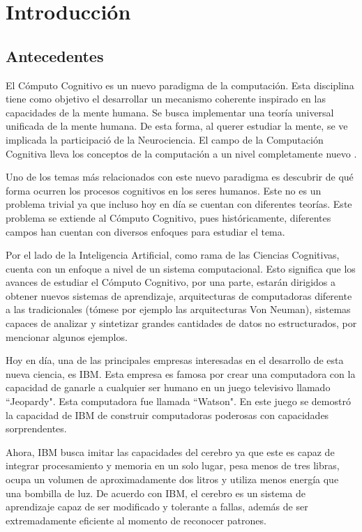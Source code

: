 \chapter{Introducci\'{o}n}
\label{ch:intro}

\section{Antecedentes}
El C\'{o}mputo Cognitivo es un nuevo paradigma de la computaci\'{o}n. Esta disciplina tiene como objetivo el desarrollar un mecanismo coherente inspirado en las capacidades de la mente humana. Se busca implementar una teor\'{i}a universal unificada de la mente humana. De esta forma, al querer estudiar la mente, se ve implicada la participaci\'{o} de la Neurociencia. El campo de la Computaci\'{o}n Cognitiva lleva los conceptos de la computaci\'{o}n a un nivel completamente nuevo \cite{cc}.

Uno de los temas m\'{a}s relacionados con este nuevo paradigma es descubrir de qu\'{e} forma ocurren los procesos cognitivos en los seres humanos. Este no es un problema trivial ya que incluso hoy en d\'{i}a se cuentan con diferentes teor\'{i}as. Este problema se extiende al C\'{o}mputo Cognitivo, pues hist\'{o}ricamente, diferentes campos han cuentan con diversos enfoques para estudiar el tema.

Por el lado de la Inteligencia Artificial, como rama de las Ciencias Cognitivas, cuenta con un enfoque a nivel de un sistema computacional. Esto significa que los avances de estudiar el C\'{o}mputo Cognitivo, por una parte, estar\'{a}n dirigidos a obtener nuevos sistemas de aprendizaje, arquitecturas de computadoras diferente a las tradicionales (t\'{o}mese por ejemplo las arquitecturas Von Neuman), sistemas capaces de analizar y sintetizar grandes cantidades de datos no estructurados, por mencionar algunos ejemplos.

Hoy en d\'{i}a, una de las principales empresas interesadas en el desarrollo de esta nueva ciencia, es IBM. Esta empresa es famosa por crear una computadora con la capacidad de ganarle a cualquier ser humano en un juego televisivo llamado “Jeopardy". Esta computadora fue llamada “Watson". En este juego se demostr\'{o} la capacidad de IBM de construir computadoras poderosas con capacidades sorprendentes. 

Ahora, IBM busca imitar las capacidades del cerebro ya que este es capaz de integrar procesamiento y memoria en un solo lugar, pesa menos de tres libras, ocupa un volumen de aproximadamente dos litros y utiliza menos energ\'{i}a que una bombilla de luz. De acuerdo con IBM, el cerebro es un sistema de aprendizaje capaz de ser modificado y tolerante a fallas, adem\'{a}s de ser extremadamente eficiente al momento de reconocer patrones. 

